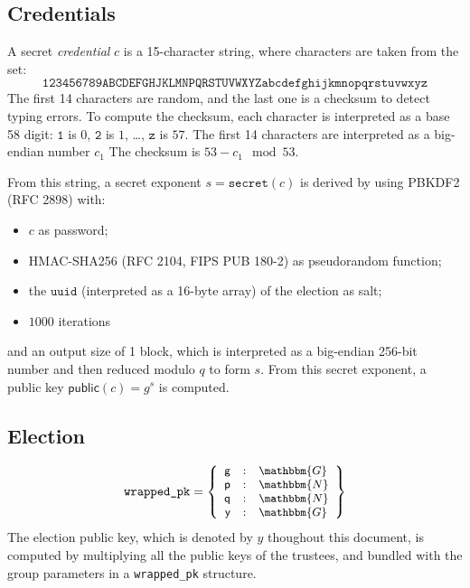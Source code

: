 \documentclass[a4paper]{article}
\newcommand{\G}{\mathbbm{G}}
\newcommand{\N}{\mathbbm{N}}
\newcommand{\public}{\textsf{public}}
\newcommand{\uuid}{\texttt{uuid}}
\begin{document}
\subsection{Credentials}
\label{credentials}

\newcommand{\secret}{\texttt{secret}}

A secret \emph{credential} $c$ is a 15-character string, where characters are
taken from the set:
\[\texttt{123456789ABCDEFGHJKLMNPQRSTUVWXYZabcdefghijkmnopqrstuvwxyz}\]
The first 14 characters are random, and the last one is a checksum to
detect typing errors. To compute the checksum, each character is
interpreted as a base 58 digit: $\texttt{1}$ is $0$, $\texttt{2}$ is
$1$, \dots, $\texttt{z}$ is $57$. The first 14 characters are
interpreted as a big-endian number $c_1$ The checksum is $53-c_1\mod
53$.

From this string, a secret exponent $s=\secret(c)$ is derived by using
PBKDF2 (RFC 2898) with:
\begin{itemize}
\item $c$ as password;
\item HMAC-SHA256 (RFC 2104, FIPS PUB 180-2) as pseudorandom function;
\item the $\uuid$ (interpreted as a 16-byte array) of the election as
  salt;
\item $1000$ iterations
\end{itemize}
and an output size of 1 block, which is interpreted as a big-endian
256-bit number and then reduced modulo $q$ to form $s$.  From this
secret exponent, a public key $\public(c)=g^s$ is computed.

\subsection{Election}
\label{elections}

\newcommand{\question}{\texttt{question}}

\begin{gather*}
  \texttt{wrapped\_pk}=\left\{\small
    \begin{array}{rcl}
      \textsf{g}&:&\G\\
      \textsf{p}&:&\N\\
      \textsf{q}&:&\N\\
      \textsf{y}&:&\G
    \end{array}
  \right\}
\end{gather*}
The election public key, which is denoted by $y$ thoughout this
document, is computed by multiplying all the public keys of the
trustees, and bundled with the group parameters in a
\texttt{wrapped\_pk} structure.
\end{document}

